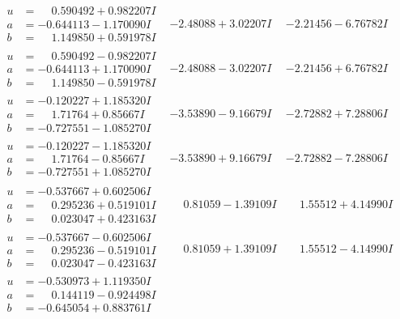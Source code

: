 \documentclass[1p]{elsarticle_modified}
\theoremstyle{definition}
\begin{document}
$$\begin{array}{c|c|c}
\begin{aligned}
u &= \phantom{-}0.590492 + 0.982207 I \\
a &= -0.644113 - 1.170090 I \\
b &= \phantom{-}1.149850 + 0.591978 I\end{aligned}
 & -2.48088 + 3.02207 I & -2.21456 - 6.76782 I \\ \hline\begin{aligned}
u &= \phantom{-}0.590492 - 0.982207 I \\
a &= -0.644113 + 1.170090 I \\
b &= \phantom{-}1.149850 - 0.591978 I\end{aligned}
 & -2.48088 - 3.02207 I & -2.21456 + 6.76782 I \\ \hline\begin{aligned}
u &= -0.120227 + 1.185320 I \\
a &= \phantom{-}1.71764 + 0.85667 I \\
b &= -0.727551 - 1.085270 I\end{aligned}
 & -3.53890 - 9.16679 I & -2.72882 + 7.28806 I \\ \hline\begin{aligned}
u &= -0.120227 - 1.185320 I \\
a &= \phantom{-}1.71764 - 0.85667 I \\
b &= -0.727551 + 1.085270 I\end{aligned}
 & -3.53890 + 9.16679 I & -2.72882 - 7.28806 I \\ \hline\begin{aligned}
u &= -0.537667 + 0.602506 I \\
a &= \phantom{-}0.295236 + 0.519101 I \\
b &= \phantom{-}0.023047 + 0.423163 I\end{aligned}
 & \phantom{-}0.81059 - 1.39109 I & \phantom{-}1.55512 + 4.14990 I \\ \hline\begin{aligned}
u &= -0.537667 - 0.602506 I \\
a &= \phantom{-}0.295236 - 0.519101 I \\
b &= \phantom{-}0.023047 - 0.423163 I\end{aligned}
 & \phantom{-}0.81059 + 1.39109 I & \phantom{-}1.55512 - 4.14990 I \\ \hline\begin{aligned}
u &= -0.530973 + 1.119350 I \\
a &= \phantom{-}0.144119 - 0.924498 I \\
b &= -0.645054 + 0.883761 I\end{aligned}

\end{array}$$
\end{document}
